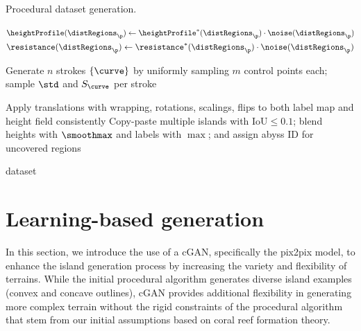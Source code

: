 \begin{algorithm}[H]
    \caption{Procedural dataset generation.}
    \label{alg:dataset-generation}
    \DontPrintSemicolon

    \BlankLine
    $\heightProfile(\distRegions_\p) \gets \heightProfile^*(\distRegions_\p)\cdot \noise(\distRegions_\p)$\;
    $\resistance(\distRegions_\p) \gets \resistance^*(\distRegions_\p)\cdot \noise(\distRegions_\p)$\;

    Generate $n$ strokes $\{\curve\}$ by uniformly sampling $m$ control points each; sample $\std$ and $S_\curve$ per stroke\;


    Apply translations with wrapping, rotations, scalings, flips to both label map and height field consistently\;
    Copy-paste multiple islands with IoU$\le 0.1$; blend heights with $\smoothmax$ and labels with $\max$; and assign abyss ID for uncovered regions\;

    \Return dataset
\end{algorithm}

\section{Learning-based generation}
\label{sec:coral-island-cGAN-training}

In this section, we introduce the use of a cGAN, specifically the pix2pix model, to enhance the island generation process by increasing the variety and flexibility of terrains. While the initial procedural algorithm generates diverse island examples (convex and concave outlines), cGAN provides additional flexibility in generating more complex terrain without the rigid constraints of the procedural algorithm that stem from our initial assumptions based on coral reef formation theory.

